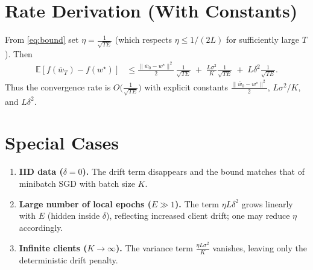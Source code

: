 \documentclass{article}
\newcommand{\E}{\mathbb{E}}
\begin{document}
\section*{Rate Derivation (With Constants)}
From \eqref{eq:bound} set $\eta = \frac{1}{\sqrt{TE}}$ (which respects $\eta\le 1/(2L)$ for sufficiently large $T$). Then
\[
\begin{aligned}
\E[f(\bar w_T)-f(w^\star)]
&\le
\frac{\|\bar w_0-w^\star\|^2}{2}\,\frac{1}{\sqrt{TE}}
\;+\;
\frac{L\sigma^2}{K}\frac{1}{\sqrt{TE}}
\;+\;
L\delta^2\frac{1}{\sqrt{TE}} .
\end{aligned}
\]
Thus the convergence rate is $O\!\big(\frac{1}{\sqrt{TE}}\big)$ with explicit constants
$\frac{\|\bar w_0-w^\star\|^2}{2}$, $L\sigma^2/K$, and $L\delta^2$.

\section*{Special Cases}
\begin{enumerate}[label={\roman*.},leftmargin=*]
\item \textbf{IID data ($\delta=0$).} The drift term disappears and the bound matches that of minibatch SGD with batch size $K$.
\item \textbf{Large number of local epochs ($E\gg1$).} The term $\eta L\delta^2$ grows linearly with $E$ (hidden inside $\delta$), reflecting increased client drift; one may reduce $\eta$ accordingly.
\item \textbf{Infinite clients ($K\to\infty$).} The variance term $\frac{\eta L\sigma^2}{K}$ vanishes, leaving only the deterministic drift penalty.
\end{enumerate}
\end{document}
